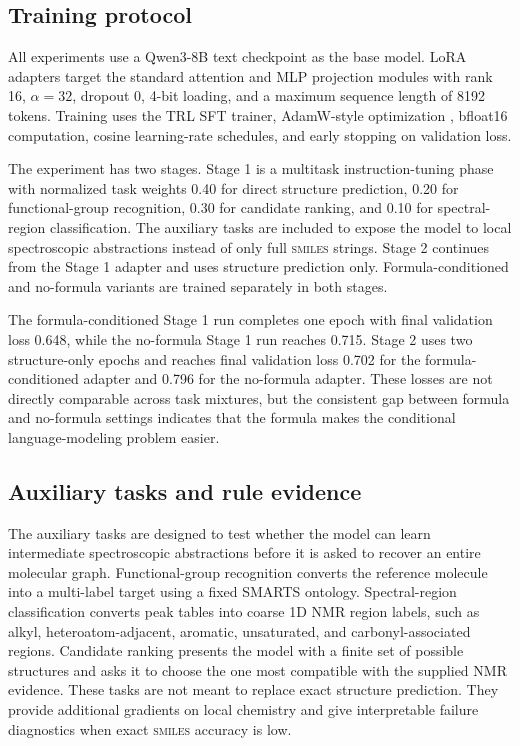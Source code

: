 \documentclass{article}
\newcommand{\smiles}{\textsc{smiles}}
\begin{document}
\subsection{Training protocol}

All experiments use a Qwen3-8B text checkpoint as the base model. LoRA adapters target the standard attention and MLP projection modules with rank 16, \(\alpha=32\), dropout 0, 4-bit loading, and a maximum sequence length of 8192 tokens. Training uses the TRL SFT trainer, AdamW-style optimization \cite{Kingma2015,Loshchilov2019}, bfloat16 computation, cosine learning-rate schedules, and early stopping on validation loss.

The experiment has two stages. Stage 1 is a multitask instruction-tuning phase with normalized task weights 0.40 for direct structure prediction, 0.20 for functional-group recognition, 0.30 for candidate ranking, and 0.10 for spectral-region classification. The auxiliary tasks are included to expose the model to local spectroscopic abstractions instead of only full \smiles{} strings. Stage 2 continues from the Stage 1 adapter and uses structure prediction only. Formula-conditioned and no-formula variants are trained separately in both stages.

The formula-conditioned Stage 1 run completes one epoch with final validation loss 0.648, while the no-formula Stage 1 run reaches 0.715. Stage 2 uses two structure-only epochs and reaches final validation loss 0.702 for the formula-conditioned adapter and 0.796 for the no-formula adapter. These losses are not directly comparable across task mixtures, but the consistent gap between formula and no-formula settings indicates that the formula makes the conditional language-modeling problem easier.

\subsection{Auxiliary tasks and rule evidence}

The auxiliary tasks are designed to test whether the model can learn intermediate spectroscopic abstractions before it is asked to recover an entire molecular graph. Functional-group recognition converts the reference molecule into a multi-label target using a fixed SMARTS ontology. Spectral-region classification converts peak tables into coarse 1D NMR region labels, such as alkyl, heteroatom-adjacent, aromatic, unsaturated, and carbonyl-associated regions. Candidate ranking presents the model with a finite set of possible structures and asks it to choose the one most compatible with the supplied NMR evidence. These tasks are not meant to replace exact structure prediction. They provide additional gradients on local chemistry and give interpretable failure diagnostics when exact \smiles{} accuracy is low.
\end{document}
